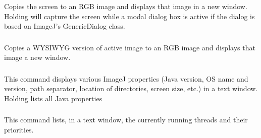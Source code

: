 

\subsubsection{\protect{}\label{sub:Capture-Screen-[g]}}

Copies the screen to an RGB image and displays that image in a new
window. Holding   
 will capture the screen while a modal dialog box
is active if the dialog is based on ImageJ's GenericDialog class. 




\subsubsection{\protect{}\label{sub:Capture-Image}}

Copies a WYSIWYG version of active image to an RGB image and displays
that image a new window.




\subsubsection{\protect{}\label{sub:ImageJ-Properties...}}

This command displays various ImageJ properties (Java version, OS
name and version, path separator, location of directories, screen
size, etc.) in a text window. Holding 
lists all Java properties




\subsubsection{\protect{}\label{sub:Threads...}}

This command lists, in a text window, the currently running threads
and their priorities.



